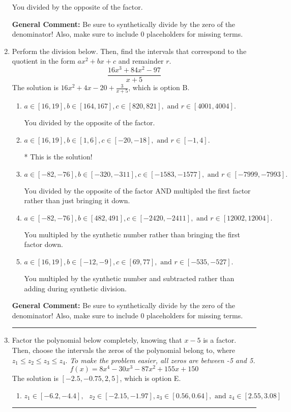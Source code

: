 \documentclass{extbook}[14pt]
\newcommand{\litem}[1]{\item #1

\rule{\textwidth}{0.4pt}}
\begin{document}
\begin{enumerate}
{\begin{enumerate}[label=\Alph*.]
 You divided by the opposite of the factor.
\end{enumerate}

\textbf{General Comment:} Be sure to synthetically divide by the zero of the denominator! Also, make sure to include 0 placeholders for missing terms.
}
\litem{
Perform the division below. Then, find the intervals that correspond to the quotient in the form $ax^2+bx+c$ and remainder $r$.
\[ \frac{16x^{3} +84 x^{2} -97}{x + 5} \]The solution is \( 16x^{2} +4 x -20 + \frac{3}{x + 5} \), which is option B.\begin{enumerate}[label=\Alph*.]
\item \( a \in [16, 19], b \in [164, 167], c \in [820, 821], \text{ and } r \in [4001, 4004]. \)

 You divided by the opposite of the factor.
\item \( a \in [16, 19], b \in [1, 6], c \in [-20, -18], \text{ and } r \in [-1, 4]. \)

* This is the solution!
\item \( a \in [-82, -76], b \in [-320, -311], c \in [-1583, -1577], \text{ and } r \in [-7999, -7993]. \)

 You divided by the opposite of the factor AND multipled the first factor rather than just bringing it down.
\item \( a \in [-82, -76], b \in [482, 491], c \in [-2420, -2411], \text{ and } r \in [12002, 12004]. \)

 You multipled by the synthetic number rather than bringing the first factor down.
\item \( a \in [16, 19], b \in [-12, -9], c \in [69, 77], \text{ and } r \in [-535, -527]. \)

 You multipled by the synthetic number and subtracted rather than adding during synthetic division.
\end{enumerate}

\textbf{General Comment:} Be sure to synthetically divide by the zero of the denominator! Also, make sure to include 0 placeholders for missing terms.
}
\litem{
Factor the polynomial below completely, knowing that $x -5$ is a factor. Then, choose the intervals the zeros of the polynomial belong to, where $z_1 \leq z_2 \leq z_3 \leq z_4$. \textit{To make the problem easier, all zeros are between -5 and 5.}
\[ f(x) = 8x^{4} -30 x^{3} -87 x^{2} +155 x + 150 \]The solution is \( [-2.5, -0.75, 2, 5] \), which is option E.\begin{enumerate}[label=\Alph*.]
\item \( z_1 \in [-6.2, -4.4], \text{   }  z_2 \in [-2.15, -1.97], z_3 \in [0.56, 0.64], \text{   and   } z_4 \in [2.55, 3.08] \)


\end{enumerate}}
\end{enumerate}
\end{document}
